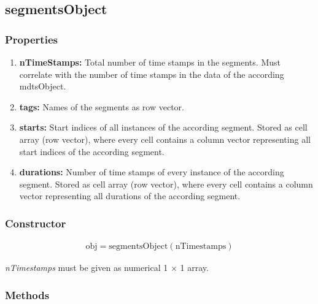 \documentclass[a4]{scrreprt}
\begin{document}
\subsection{segmentsObject}
\label{ChpDescriptionSegmentsObject}

\subsubsection{Properties}

\begin{enumerate}
	\item \textbf{nTimeStamps:} Total number of time stamps in the segments. Must correlate with the number of time stamps in the data of the according mdtsObject.
	\item \textbf{tags:} Names of the segments as row vector.
	\item \textbf{starts:} Start indices of all instances of the according segment. Stored as cell array (row vector), where every cell contains a column vector representing all start indices of the according segment.
	\item \textbf{durations:} Number of time stamps of every instance of the according segment. Stored as cell array (row vector), where every cell contains a column vector representing all durations of the according segment.
\end{enumerate}

\subsubsection{Constructor}

\begin{align*}
\text{obj} = \text{segmentsObject}(\text{nTimestamps})
\end{align*}

\textit{nTimestamps} must be given as numerical 1 $\times$ 1 array.

\subsubsection{Methods}
\end{document}
